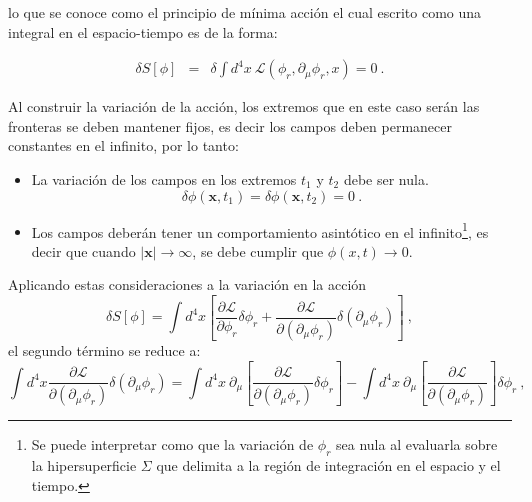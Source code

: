 \noindent
lo que se conoce como el principio de mínima acción el cual escrito como una integral en el espacio-tiempo es de la forma:

\begin{eqnarray}
\delta S[\phi] &=&\delta \int d^{4}x\ \mathcal{L}\left( \phi _{r},\partial _{\mu
}\phi_{r},x\right)=0~.  \label{2.18}
\end{eqnarray}

\noindent
Al construir la variación de la acción, los extremos que en este caso serán las fronteras se deben mantener fijos, es decir los campos deben permanecer constantes en el infinito, por lo tanto:

\begin{itemize}
    \item La variación de los campos en los extremos $t_{1}$ y $t_{2}$ debe ser nula.
    \begin{equation*}
        \delta\phi(\mathbf{x},t_{1})=\delta\phi(\mathbf{x},t_{2})=0~.
    \end{equation*}
    \item Los campos deberán tener un comportamiento asintótico en el infinito\footnote{Se puede interpretar como que la variaci\'{o}n de $\phi_{r}$ sea nula al evaluarla sobre la hipersuperficie  $\Sigma$ que delimita a la regi\'{o}n de integraci\'{o}n en el espacio y el tiempo.}, es decir que cuando $\left\vert \mathbf{x}\right\vert \rightarrow \infty $, se debe cumplir que $\phi(x,t)\rightarrow0$. 
\end{itemize}
\vspace{0.4cm}
\noindent
Aplicando estas consideraciones a la variación en la acción
\begin{equation}
\delta S\left[ \phi \right] =\int d^{4}x\left[ \frac{\partial \mathcal{L}}{\partial \phi _{r}}\delta \phi _{r}+\frac{\partial \mathcal{L}}{\partial \left( \partial _{\mu }\phi _{r}\right) }\delta \left( \partial _{\mu }\phi_{r}\right) \right] ~,
\label{2aa}
\end{equation}
el segundo término se reduce a:
\begin{equation*}
\int d^{4}x\frac{\partial \mathcal{L}}{\partial \left( \partial _{\mu }\phi_{r}\right) }\delta \left( \partial _{\mu }\phi _{r}\right) =\int d^{4}x~\partial _{\mu }\left[ \frac{\partial \mathcal{L}}{\partial \left( \partial _{\mu }\phi _{r}\right) }\delta \phi _{r}\right] -\int d^{4}x~\partial _{\mu }\left[ \frac{\partial \mathcal{L}}{\partial \left( \partial _{\mu }\phi _{r}\right) }\right] \delta \phi _{r}~,
\end{equation*}
